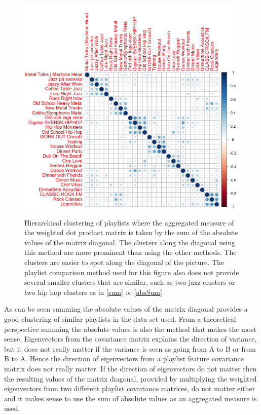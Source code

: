 \documentclass[a4paper,11pt]{kth-mag}
\begin{document}
\begin{figure}
\includegraphics[scale=0.5]{images/sumAbs.png}
\caption{Hierarchical clustering of playlists where the aggregated measure of the weighted dot product matrix is taken by the sum of the absolute values of the matrix diagonal. The clusters along the diagonal using this method are more prominent than using the other methods. The clusters are easier to spot along the diagonal of the picture. The playlist comparison method used for this figure also does not provide several smaller clusters that are similar, such as two jazz clusters or two hip hop clusters as in \ref{sum} or \ref{absSum}}
\end{figure}


As can be seen summing the absolute values of the matrix diagonal provides a good clustering of similar playlists in the data set used. From a theoretical perspective summing the absolute values is also the method that makes the most sense. Eigenvectors from the covariance matrix explains the direction of variance, but it does not really matter if the variance is seen as going from A to B or from B to A. Hence the direction of eigenvectors from a playlist feature covariance matrix does not really matter. If the direction of eigenvectors do not matter then the resulting values of the matrix diagonal, provided by multiplying the weighted eigenvectors from two different playlist covariance matrices, do not matter either and it makes sense to use the sum of absolute values as an aggregated measure is used.
\end{document}
